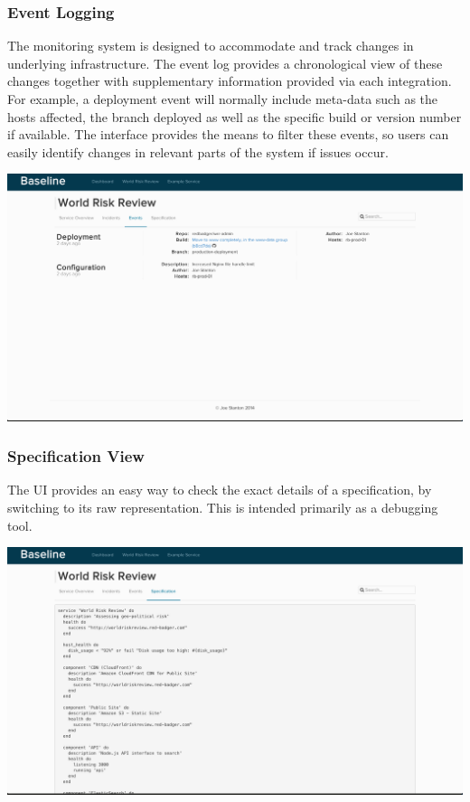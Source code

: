 \documentclass{cshonours}
\begin{document}
\subsubsection{Event Logging}

The monitoring system is designed to accommodate and track changes in underlying infrastructure. The event log provides a chronological view of these changes together with supplementary information provided via each integration. For example, a deployment event will normally include meta-data such as the hosts affected, the branch deployed as well as the specific build or version number if available. The interface provides the means to filter these events, so users can easily identify changes in relevant parts of the system if issues occur.

\begin{center}
  \label{webui-events}
  \includegraphics[scale=0.28]{web-ui/events.png}
\end{center}

\subsubsection{Specification View}
The UI provides an easy way to check the exact details of a specification, by switching to its raw representation. This is intended primarily as a debugging tool.

\begin{center}
  \includegraphics[scale=0.28]{web-ui/specification.png}
\end{center}
\end{document}
